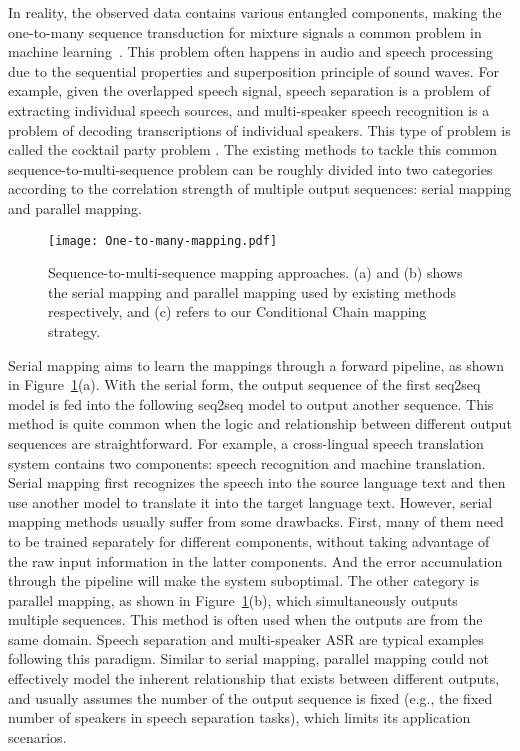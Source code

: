 \documentclass{article}
\begin{document}
In reality, the observed data contains various entangled components, making the one-to-many sequence transduction for mixture signals a common problem in machine learning~\cite{bss1997,jung1998extended,roweis2001one}.
This problem often happens in audio and speech processing due to the sequential properties and superposition principle of sound waves.
For example, given the overlapped speech signal, speech separation is a problem of extracting individual speech sources, and multi-speaker speech recognition is a problem of decoding transcriptions of individual speakers.
This type of problem is called the cocktail party problem \cite{cherry1953some,bregman1994auditory}.
The existing methods to tackle this common sequence-to-multi-sequence problem can be roughly divided into two categories according to the correlation strength of multiple output sequences: serial mapping and parallel mapping. 
\begin{figure}[tbh]
  \centering
  \texttt{[image: One-to-many-mapping.pdf]}
  \label{fig:mapping}
  \caption{Sequence-to-multi-sequence mapping approaches. (a) and (b) shows the serial mapping and parallel mapping used by existing methods respectively, and (c) refers to our Conditional Chain mapping strategy.}
\end{figure}
Serial mapping aims to learn the mappings through a forward pipeline, as shown in Figure~\ref{fig:mapping}(a).
With the serial form, the output sequence of the first seq2seq model is fed into the following seq2seq model to output another sequence. 
This method is quite common when the logic and relationship between different output sequences are straightforward. 
For example, a cross-lingual speech translation system contains two components: speech recognition and machine translation. 
Serial mapping first recognizes the speech into the source language text and then use another model to translate it into the target language text. 
However, serial mapping methods usually suffer from some drawbacks. First, many of them need to be trained separately for different components, without taking advantage of the raw input information in the latter components. And the error accumulation through the pipeline will make the system suboptimal. The other category is parallel mapping, as shown in Figure~\ref{fig:mapping}(b), which simultaneously outputs multiple sequences. 
This method is often used when the outputs are from the same domain. Speech separation and multi-speaker ASR are typical examples following this paradigm.
Similar to serial mapping, parallel mapping could not effectively model the inherent relationship that exists between different outputs, and usually assumes the number of the output sequence is fixed (e.g., the fixed number of speakers in speech separation tasks), which limits its application scenarios.
\end{document}
